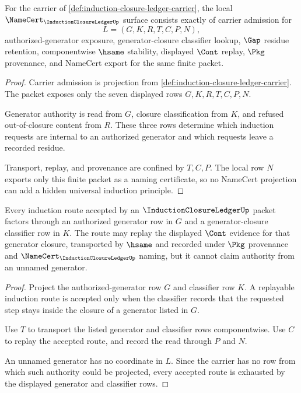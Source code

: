 \begin{theorem}
\label{thm:induction-closure-ledger-namecert-obligations}
For the carrier of \autoref{def:induction-closure-ledger-carrier}, the local $\NameCert_{\InductionClosureLedgerUp}$ surface consists exactly of carrier admission for
$$
L=(G,K,R,T,C,P,N),
$$
authorized-generator exposure, generator-closure classifier lookup, $\Gap$ residue retention, componentwise $\hsame$ stability, displayed $\Cont$ replay, $\Pkg$ provenance, and NameCert export for the same finite packet.
\end{theorem}
\begin{proof}
Carrier admission is projection from \autoref{def:induction-closure-ledger-carrier}. The packet exposes only the seven displayed rows $G,K,R,T,C,P,N$.

Generator authority is read from $G$, closure classification from $K$, and refused out-of-closure content from $R$. These three rows determine which induction requests are internal to an authorized generator and which requests leave a recorded residue.

Transport, replay, and provenance are confined by $T,C,P$. The local row $N$ exports only this finite packet as a naming certificate, so no NameCert projection can add a hidden universal induction principle.
\end{proof}

\begin{theorem}
\label{thm:induction-closure-ledger-generator-authority}
Every induction route accepted by an $\InductionClosureLedgerUp$ packet factors through an authorized generator row in $G$ and a generator-closure classifier row in $K$. The route may replay the displayed $\Cont$ evidence for that generator closure, transported by $\hsame$ and recorded under $\Pkg$ provenance and $\NameCert_{\InductionClosureLedgerUp}$ naming, but it cannot claim authority from an unnamed generator.
\end{theorem}
\begin{proof}
Project the authorized-generator row $G$ and classifier row $K$. A replayable induction route is accepted only when the classifier records that the requested step stays inside the closure of a generator listed in $G$.

Use $T$ to transport the listed generator and classifier rows componentwise. Use $C$ to replay the accepted route, and record the read through $P$ and $N$.

An unnamed generator has no coordinate in $L$. Since the carrier has no row from which such authority could be projected, every accepted route is exhausted by the displayed generator and classifier rows.
\end{proof}

